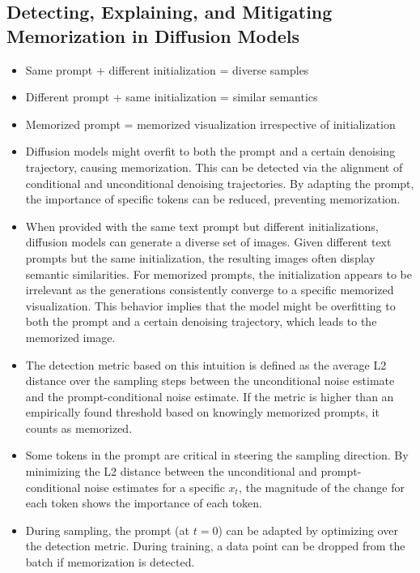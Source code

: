 \documentclass{article}
\begin{document}
\subsection{Detecting, Explaining, and Mitigating Memorization in Diffusion Models}
\begin{tldr}
    \begin{itemize}
        \item Same prompt + different initialization = diverse samples
        \item Different prompt + same initialization = similar semantics
        \item Memorized prompt = memorized visualization irrespective of initialization
        \item Diffusion models might overfit to both the prompt and a certain denoising trajectory, causing memorization. This can be detected via the alignment of conditional and unconditional denoising trajectories. By adapting the prompt, the importance of specific tokens can be reduced, preventing memorization.
    \end{itemize}
\end{tldr}
\begin{itemize}
    \item  When provided with the same text prompt but different initializations, diffusion models can generate a diverse set of images. Given different text prompts but the same initialization, the resulting images often display semantic similarities. For memorized prompts, the initialization appears to be irrelevant as the generations consistently converge to a specific memorized visualization. This behavior implies that the model might be overfitting to both the prompt and a certain denoising trajectory, which leads to the memorized image.
    \item The detection metric based on this intuition is defined as the average L2 distance over the sampling steps between the unconditional noise estimate and the prompt-conditional noise estimate. If the metric is higher than an empirically found threshold based on knowingly memorized prompts, it counts as memorized.
    \item Some tokens in the prompt are critical in steering the sampling direction. By minimizing the L2 distance between the unconditional and prompt-conditional noise estimates for a specific $x_t$, the magnitude of the change for each token shows the importance of each token.
    \item During sampling, the prompt (at $t=0$) can be adapted by optimizing over the detection metric. During training, a data point can be dropped from the batch if memorization is detected.
\end{itemize}
\end{document}
